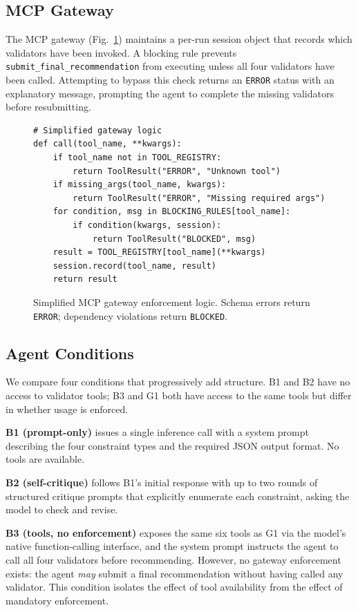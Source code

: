 \documentclass[conference]{IEEEtran}
\begin{document}
\subsection{MCP Gateway}

The MCP gateway (Fig.~\ref{fig:gateway}) maintains a per-run session object
that records which validators have been invoked.  A blocking rule prevents
\texttt{submit\_final\_recommendation} from executing unless all four
validators have been called.  Attempting to bypass this check returns an
\texttt{ERROR} status with an explanatory message, prompting the agent to
complete the missing validators before resubmitting.

\begin{figure}[t]
\centering
\begin{lstlisting}
# Simplified gateway logic
def call(tool_name, **kwargs):
    if tool_name not in TOOL_REGISTRY:
        return ToolResult("ERROR", "Unknown tool")
    if missing_args(tool_name, kwargs):
        return ToolResult("ERROR", "Missing required args")
    for condition, msg in BLOCKING_RULES[tool_name]:
        if condition(kwargs, session):
            return ToolResult("BLOCKED", msg)
    result = TOOL_REGISTRY[tool_name](**kwargs)
    session.record(tool_name, result)
    return result
\end{lstlisting}
\caption{Simplified MCP gateway enforcement logic. Schema errors return
\texttt{ERROR}; dependency violations return \texttt{BLOCKED}.}
\label{fig:gateway}
\end{figure}

\subsection{Agent Conditions}

We compare four conditions that progressively add structure.  B1 and B2
have no access to validator tools; B3 and G1 both have access to the
same tools but differ in whether usage is enforced.

\textbf{B1 (prompt-only)} issues a single inference call with a system
prompt describing the four constraint types and the required JSON output
format.  No tools are available.

\textbf{B2 (self-critique)} follows B1's initial response with up to two
rounds of structured critique prompts that explicitly enumerate each
constraint, asking the model to check and revise.

\textbf{B3 (tools, no enforcement)} exposes the same six tools as G1
via the model's native function-calling interface, and the system prompt
instructs the agent to call all four validators before recommending.
However, no gateway enforcement exists: the agent \emph{may} submit a
final recommendation without having called any validator.  This condition
isolates the effect of tool availability from the effect of mandatory
enforcement.
\end{document}
